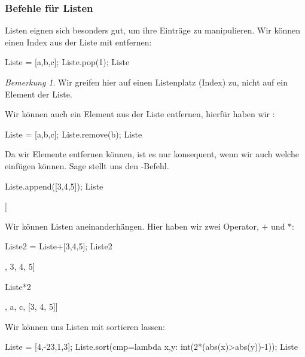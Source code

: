 \documentclass[fontsize=12pt,paper=a4,twoside,bibtotoc,idxtotoc,
liststotoc,pagesize,BCOR1.2cm,DIV15,chapterprefix,pagesize=pdftex]{scrbook}
\theoremstyle{plain}
\theoremstyle{definition}
\theoremstyle{remark}
\newtheorem{bem}[equation]{Bemerkung}
\begin{document}
\subsubsection{Befehle für Listen}
Listen eignen sich besonders gut, um ihre Einträge zu manipulieren.
Wir können einen Index aus der Liste mit  entfernen:
\begin{sagein}
Liste = [a,b,c]; Liste.pop(1); Liste 
\end{sagein}
\begin{sageout}
  [a, c]
\end{sageout}
\begin{bem}
 Wir greifen hier auf einen Listenplatz (Index) zu, nicht auf ein Element der Liste.
\end{bem}
Wir können auch ein Element aus der Liste entfernen, hierfür haben wir :
\begin{sagein}
Liste = [a,b,c]; Liste.remove(b); Liste
\end{sagein}
\begin{sageout}
  [a, c]
\end{sageout}
Da wir Elemente entfernen können, ist es nur konsequent, wenn wir auch welche einfügen können. Sage stellt uns den -Befehl.
\begin{sagein}
Liste.append([3,4,5]); Liste
\end{sagein}
\begin{sageout}
[a, c, [3, 4, 5]]
\end{sageout}
Wir können Listen aneinanderhängen. Hier haben wir zwei Operator, $+$ und $*$:
\begin{sagein}
Liste2 = Liste+[3,4,5]; Liste2
\end{sagein}
\begin{sageout}
[a, c, [3, 4, 5], 3, 4, 5]
\end{sageout}
\begin{sagein}
Liste*2
\end{sagein}
\begin{sageout}
 [a, c, [3, 4, 5], a, c, [3, 4, 5]]
\end{sageout}
Wir können uns Listen mit  sortieren lassen:
\begin{sagein}
Liste = [4,-23,1,3]; Liste.sort(cmp=lambda x,y: int(2*(abs(x)>abs(y))-1)); Liste
\end{sagein}
\begin{sageout}
[1, 3, 4, -23]
\end{sageout}
\end{document}
